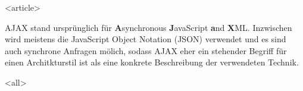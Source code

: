 \mode
<article>

AJAX stand ursprünglich für
\textbf{A}synchronous \textbf{J}avaScript \textbf{a}nd \textbf{X}ML.
Inzwischen wird meistens die JavaScript Object Notation (JSON)
verwendet und es sind auch synchrone Anfragen mölich, sodass
AJAX eher ein stehender Begriff für einen Architkturstil ist als
eine konkrete Beschreibung der verwendeten Technik.

\mode
<all>
